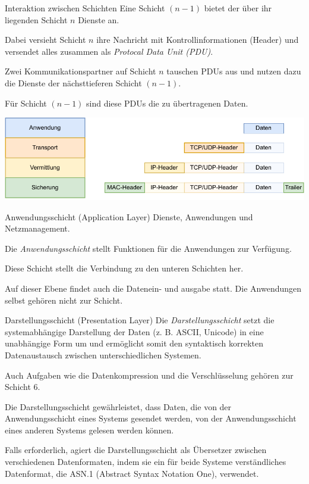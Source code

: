\begin{defi}{Interaktion zwischen Schichten}
    Eine Schicht $(n-1)$ bietet der über ihr liegenden Schicht $n$ Dienste an.

    Dabei versieht Schicht $n$ ihre Nachricht mit Kontrollinformationen (Header) und versendet alles zusammen als \emph{Protocal Data Unit (PDU)}.

    Zwei Kommunikationspartner auf Schicht $n$ tauschen PDUs aus und nutzen dazu die Dienste der nächsttieferen Schicht $(n-1)$.

    Für Schicht $(n-1)$ sind diese PDUs die zu übertragenen Daten.

    \centering
    \includegraphics[width=\textwidth]{includes/figures/defi_header_kapselung.pdf}
\end{defi}

\begin{defi}{Anwendungsschicht (Application Layer)}
    Dienste, Anwendungen und Netzmanagement.

    Die \emph{Anwendungsschicht} stellt Funktionen für die Anwendungen zur Verfügung.

    Diese Schicht stellt die Verbindung zu den unteren Schichten her.

    Auf dieser Ebene findet auch die Datenein- und ausgabe statt.
    Die Anwendungen selbst gehören nicht zur Schicht.
\end{defi}

\begin{defi}{Darstellungsschicht (Presentation Layer)}
    Die \emph{Darstellungsschicht} setzt die systemabhängige Darstellung der Daten (z. B. ASCII, Unicode) in eine unabhängige Form um und ermöglicht somit den syntaktisch korrekten Datenaustausch zwischen unterschiedlichen Systemen.

    Auch Aufgaben wie die Datenkompression und die Verschlüsselung gehören zur Schicht 6.

    Die Darstellungsschicht gewährleistet, dass Daten, die von der Anwendungsschicht eines Systems gesendet werden, von der Anwendungsschicht eines anderen Systems gelesen werden können.

    Falls erforderlich, agiert die Darstellungsschicht als Übersetzer zwischen verschiedenen Datenformaten, indem sie ein für beide Systeme verständliches Datenformat, die ASN.1 (Abstract Syntax Notation One), verwendet.
\end{defi}

